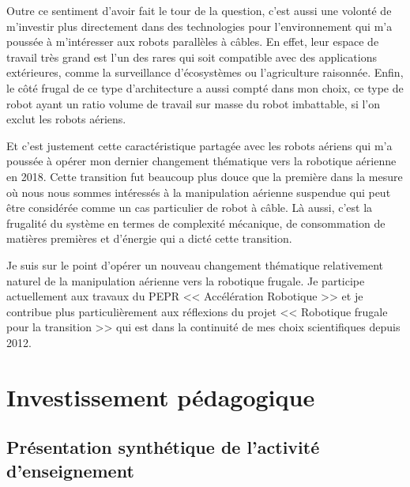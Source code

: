 \documentclass[a4paper,12pt]{article}
\newcommand{\Separation}{\noindent{\color{black!40}\rule{\textwidth}{2pt}}}
\begin{document}
Outre ce sentiment d'avoir fait le tour de la question, c'est aussi une volonté de m'investir plus directement dans des technologies pour l'environnement qui m'a poussée à m'intéresser aux robots parallèles à câbles. En effet, leur espace de travail très grand est l'un des rares qui soit compatible avec des applications extérieures, comme la surveillance d'écosystèmes ou l'agriculture raisonnée. Enfin, le côté frugal de ce type d'architecture a aussi compté dans mon choix, ce type de robot ayant un ratio volume de travail sur masse du robot imbattable, si l'on exclut les robots aériens.

Et c'est justement cette caractéristique partagée avec les robots aériens qui m'a poussée à opérer mon dernier changement thématique vers la robotique aérienne en 2018. Cette transition fut beaucoup plus douce que la première dans la mesure où nous nous sommes intéressés à la manipulation aérienne suspendue qui peut être considérée comme un cas particulier de robot à câble. Là aussi, c'est la frugalité du système en termes de complexité mécanique, de consommation de matières premières et d'énergie qui a dicté cette transition.

Je suis sur le point d'opérer un nouveau changement thématique relativement naturel de la manipulation aérienne vers la robotique frugale. Je participe actuellement aux travaux du PEPR << Accélération Robotique >> et je contribue plus particulièrement aux réflexions du projet << Robotique frugale pour la transition >> qui est dans la continuité de mes choix scientifiques depuis 2012.

\Separation{}


\section{Investissement pédagogique}

\subsection{Présentation synthétique de l'activité d'enseignement}
\end{document}
